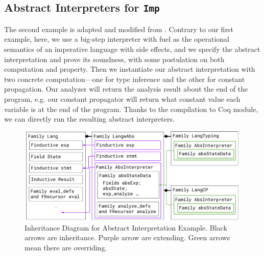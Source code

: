 \subsection{Abstract Interpreters for \texttt{Imp}}
\label{sec:coqexample-analysis}
The second example is adapted and modified from \citet{zm2017}.
Contrary to our first example, here, we use a big-step interpreter with fuel
as the operational semantics of an imperative language with
side effects, and we specify the abstract interpretation and prove its
soundness, with some postulation on both computation and property. Then we instantiate our abstract interpretation with two concrete computation---one for type inference and the other for constant propagation. Our analyzer will return the analysis result about the end of the program, e.g. our constant propagator will return what constant value each variable is at the end of the program. Thanks to the compilation to Coq module, we can directly run the resulting
abstract interpreters.



\begin{figure}[!htb]
  \includegraphics[width=\columnwidth]{coqexmaple/Family-Lang-Imp3.pdf}
  \caption{Inheritance Diagram for Abstract Interpretation Example. Black arrows are inheritance. Purple arrow are extending. Green arrows mean there are overriding.}\label{fig:abstract-interpretation-example}
\end{figure}


